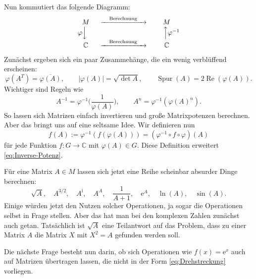 \documentclass[a4paper,11pt,fleqn,twoside]{scrartcl}
\numberwithin{equation}{section}
\newcommand{\C}{\mathbb C}
\renewcommand{\Re}{\operatorname{Re}}
\newcommand{\ui}{\mathrm i}
\newcommand{\ee}{\mathrm e}
\theoremstyle{rmbox}
\begin{document}
Nun kommutiert das folgende Diagramm:
\begin{equation}
\begin{matrix}
M & \xrightarrow{\quad\text{Berechnung}\quad} & M\\
\varphi\Big\downarrow\hspace{1em} & & \hspace{1.4em}\Big\uparrow\varphi^{-1}\\
\C & \xrightarrow{\quad\text{Berechnung}\quad} & \C
\end{matrix}
\end{equation}
Zunächst ergeben sich ein paar Zusammehänge, die ein wenig
verblüffend erscheinen:
\begin{equation}
\varphi(A^T) = \overline{\varphi(A)},\qquad
|\varphi(A)| = \sqrt{\det A},\qquad
\operatorname{Spur}(A) = 2\Re(\varphi(A)).
\end{equation}
Wichtiger sind Regeln wie
\begin{equation}\label{eq:Inverse-Potenz}
A^{-1} = \varphi^{-1}\bigg(\frac{1}{\varphi(A)}\bigg),\qquad
A^n = \varphi^{-1}(\varphi(A)^n).
\end{equation}
So lassen sich Matrizen einfach invertieren und große
Matrixpotenzen berechnen. Aber das bringt uns auf eine seltsame
Idee. Wir definieren nun
\begin{equation}
f(A) := \varphi^{-1}(f(\varphi(A))) = (\varphi^{-1}\circ f\circ\varphi)(A)
\end{equation}
für jede Funktion $f\colon G\to\C$ mit $\varphi(A)\in G$.
Diese Definition erweitert \eqref{eq:Inverse-Potenz}.

Für eine Matrix $A\in M$ lassen sich jetzt eine Reihe scheinbar
absurder Dinge berechnen:%
\begin{equation}
\sqrt{A},\quad A^{3/2},\quad A^\ui, \quad A^A,\quad \frac{1}{A+1},
\quad \ee^A, \quad \ln(A), \quad \sin(A).
\end{equation}
Einige würden jetzt den Nutzen solcher Operationen, ja sogar die
Operationen selbst in Frage stellen. Aber das hat man bei den
komplexen Zahlen zunächst auch getan. Tatsächlich ist $\sqrt{A}$ eine
Teilantwort auf das Problem, dass zu einer Matrix $A$ die Matrix $X$
mit $X^2=A$ gefunden werden soll.

Die nächste Frage besteht nun darin, ob sich Operationen
wie $f(x)=\ee^x$ auch auf Matrizen übertragen lassen,
die nicht in der Form \eqref{eq:Drehstreckung} vorliegen.

\printindex
\end{document}
